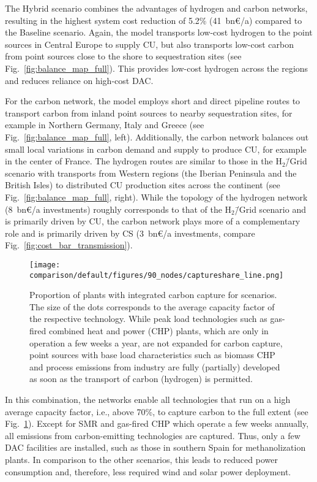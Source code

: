 \documentclass[twocolumn]{article}
\newcommand{\baselinescenario}{Baseline scenario}
\newcommand{\hydrogenscenario}{H$_2$\=/Grid scenario}
\newcommand{\hybridscenario}{Hybrid scenario}
\begin{document}
The \hybridscenario{} combines the advantages of hydrogen and carbon networks, resulting in the highest system cost reduction of 5.2\% (41~bn€/a) compared to the \baselinescenario{}. Again, the model transports low-cost hydrogen to the point sources in Central Europe to supply CU, but also transports low-cost carbon from point sources close to the shore to sequestration sites (see Fig.~\ref{fig:balance_map_full}). This provides low-cost hydrogen across the regions and reduces reliance on high-cost DAC.


For the carbon network, the model employs short and direct pipeline routes to transport carbon from inland point sources to nearby sequestration sites, for example in Northern Germany, Italy and Greece (see Fig.~\ref{fig:balance_map_full}, left). Additionally, the carbon network balances out small local variations in carbon demand and supply to produce CU, for example in the center of France.
The hydrogen routes are similar to those in the \hydrogenscenario{} with transports from Western regions (the Iberian Peninsula and the British Isles) to distributed CU production sites across the continent (see Fig.~\ref{fig:balance_map_full}, right).
While the topology of the hydrogen network (8~bn€/a investments) roughly corresponds to that of the \hydrogenscenario{} and is primarily driven by CU, the carbon network plays more of a complementary role and is primarily driven by CS (3~bn€/a investments, compare Fig.~\ref{fig:cost_bar_transmission}).


\begin{figure}[ht]
    \centering
    \texttt{[image: comparison/default/figures/90\_nodes/captureshare\_line.png]}
    \caption{Proportion of plants with integrated carbon capture for scenarios. The size of the dots corresponds to the average capacity factor of the respective technology. While peak load technologies such as gas-fired combined heat and power (CHP) plants, which are only in operation a few weeks a year, are not expanded for carbon capture, point sources with base load characteristics such as biomass CHP and process emissions from industry are fully (partially) developed as soon as the transport of carbon (hydrogen) is permitted.}
    \label{fig:captureshare_line}
\end{figure}%


In this combination, the networks enable all technologies that run on a high average capacity factor, i.e., above 70\%, to capture carbon to the full extent (see Fig.~\ref{fig:captureshare_line}). Except for SMR and gas-fired CHP which operate a few weeks annually, all emissions from carbon-emitting technologies are captured.
Thus, only a few DAC facilities are installed, such as those in southern Spain for methanolization plants. In comparison to the other scenarios, this leads to reduced power consumption and, therefore, less required wind and solar power deployment.
\end{document}
